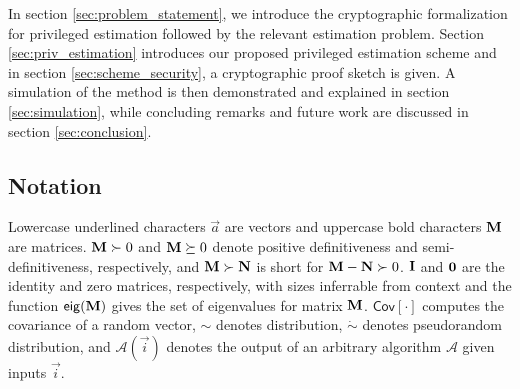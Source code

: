 \documentclass[letterpaper, 10 pt, conference]{ieeeconf}
\begin{document}
In section \ref{sec:problem_statement}, we introduce the cryptographic formalization for privileged estimation followed by the relevant estimation problem. Section \ref{sec:priv_estimation} introduces our proposed privileged estimation scheme and in section \ref{sec:scheme_security}, a cryptographic proof sketch is given. A simulation of the method is then demonstrated and explained in section \ref{sec:simulation}, while concluding remarks and future work are discussed in section \ref{sec:conclusion}.

% 
% 

\subsection{Notation}
Lowercase underlined characters $\vec{a}$ are vectors and uppercase bold characters ${{\mathbf{M}}}$ are matrices. ${{\mathbf{M}}}\succ 0$ and ${{\mathbf{M}}} \succeq 0$ denote positive definitiveness and semi-definitiveness, respectively, and ${{\mathbf{M}}} \succ {\ensuremath{{\mathbf{N}}}}$ is short for ${{\mathbf{M}}}-{{\mathbf{N}}}\succ 0$. ${{\mathbf{I}}}$ and ${{\mathbf{0}}}$ are the identity and zero matrices, respectively, with sizes inferrable from context and the function $\mathsf{eig}({{\mathbf{M}}})$ gives the set of eigenvalues for matrix ${{\mathbf{M}}}$. $\mathsf{Cov}[\cdot]$ computes the covariance of a random vector, $\sim$ denotes distribution, $\dot{\sim}$ denotes pseudorandom distribution, and $\mathcal{A}(\vec{i})$ denotes the output of an arbitrary algorithm $\mathcal{A}$ given inputs $\vec{i}$.

% 
%                                              
%                                              
%                                              
% 
\end{document}
